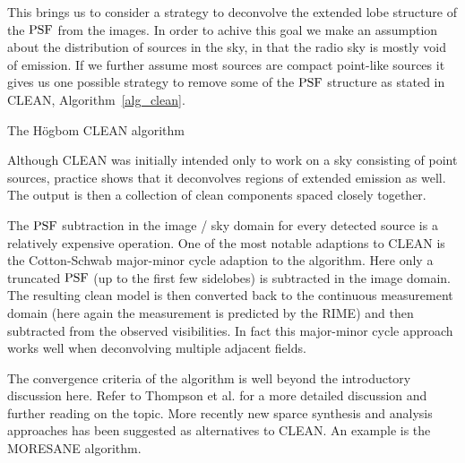 This brings us to consider a strategy to deconvolve the extended lobe structure of the $\textrm{PSF}$ from the images. In order to achive this goal we make an assumption about the distribution of sources in the sky, in that the radio
sky is mostly void of emission. If we further assume most sources are compact point-like sources it gives us one possible strategy to remove some of the $\textrm{PSF}$ structure as stated in CLEAN, Algorithm~\ref{alg_clean}.
\begin{algorithm}
  \begin{algorithmic}
  \REPEAT
  \end{algorithmic}
  \caption{The H\"ogbom CLEAN algorithm}
  \label{alg_clean}
\end{algorithm}

Although CLEAN was initially intended only to work on a sky consisting of point sources, practice shows that it
deconvolves regions of extended emission as well. The output is then a collection of clean components spaced closely
together. 

The $\textrm{PSF}$ subtraction in the image / sky domain for every detected source is a relatively expensive operation. One of the
most notable adaptions to CLEAN is the Cotton-Schwab major-minor cycle adaption to the algorithm. Here only a truncated
$\textrm{PSF}$ (up to the first few sidelobes) is subtracted in the image domain. The resulting clean model is then converted back
to the continuous measurement domain (here again the measurement is predicted by the RIME) and then subtracted from the 
observed visibilities. In fact this major-minor cycle approach works well when deconvolving multiple adjacent fields. 

The convergence criteria of the algorithm is well beyond the introductory discussion here. Refer to Thompson et 
al. \cite[ch 11]{thompson2008interferometry} for a more detailed discussion and further reading on the topic. More
recently new sparce synthesis and analysis approaches has been suggested as alternatives to CLEAN. An example is the 
MORESANE \cite{dabbech2015moresane} algorithm.

